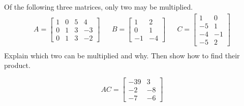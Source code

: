 
\begin{exerciseStatement}


Of the following three matrices, only two may be multiplied. 
\begin{align*} A= \left[\begin{array}{cccc}
1 & 0 & 5 & 4 \\
0 & 1 & 3 & -3 \\
0 & 1 & 3 & -2
\end{array}\right]  & & B= \left[\begin{array}{cc}
1 & 2 \\
0 & 1 \\
-1 & -4
\end{array}\right]  & & C= \left[\begin{array}{cc}
1 & 0 \\
-5 & 1 \\
-4 & -1 \\
-5 & 2
\end{array}\right]  \\ \end{align*}
             Explain which two can be multiplied and why. Then show how to find their product.


\end{exerciseStatement}
    
\begin{exerciseAnswer} 
\[AC= \left[\begin{array}{cc}
-39 & 3 \\
-2 & -8 \\
-7 & -6
\end{array}\right] \]
\end{exerciseAnswer}
    
